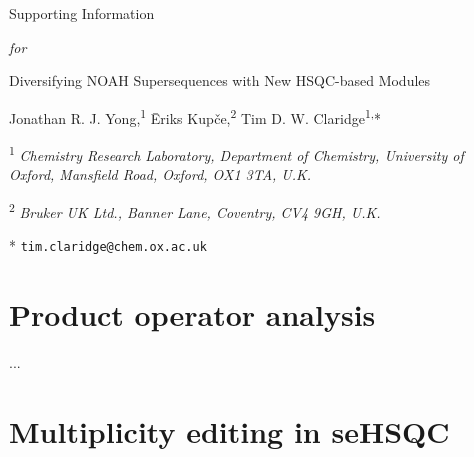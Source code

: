 \newcommand{\sectionbreak}{\clearpage}
\renewcommand\thefigure{S\arabic{figure}}
\renewcommand\thetable{S\arabic{table}}
\setcounter{page}{1}
\setcounter{figure}{0}
\setcounter{table}{0}
\onehalfspacing

\hspace{0pt}
\vfill
\begin{center}
    \huge
    Supporting Information

    \textit{for}

    Diversifying NOAH Supersequences with New HSQC-based Modules

    \vspace{1cm}

    \Large Jonathan R. J. Yong,\textsuperscript{1} {\=E}riks Kup{\v{c}}e,\textsuperscript{2} Tim D. W. Claridge\textsuperscript{1,}*

    \vspace{1cm}

    \large \textsuperscript{1} \textit{Chemistry Research Laboratory, Department of Chemistry, University of Oxford, Mansfield Road, Oxford, OX1 3TA, U.K.}

    \textsuperscript{2} \textit{Bruker UK Ltd., Banner Lane, Coventry, CV4 9GH, U.K.}

    * \texttt{tim.claridge@chem.ox.ac.uk}
\end{center}
\thispagestyle{empty}
\vfill
\hspace{0pt}
\newpage

\tableofcontents

\newpage

\section{Product operator analysis}

... 

\section{Multiplicity editing in seHSQC}


